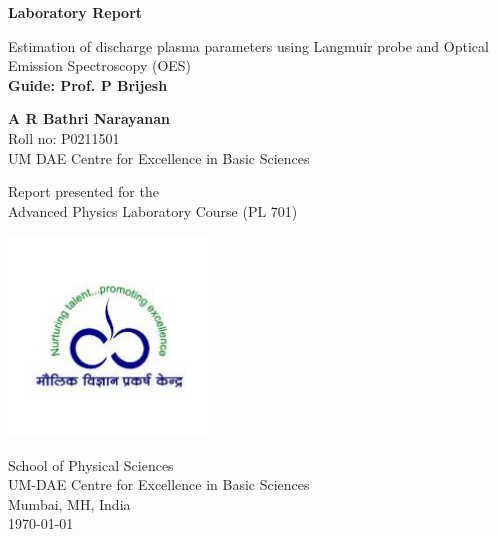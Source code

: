 \begin{titlepage}
	\begin{center}
		\vspace*{0.8cm}
		
		\Huge
		\textbf{Laboratory Report}
		
		\vspace{0.5cm}
		\LARGE
		Estimation of discharge plasma parameters using Langmuir probe and Optical Emission Spectroscopy (OES)\\
		\vspace{0.5cm}
		\textbf{Guide: Prof. P Brijesh}
		
		\vspace{1.5cm}
		
		\textbf{A R Bathri Narayanan}\\
		Roll no: P0211501\\
		UM DAE Centre for Excellence in Basic Sciences
		
		\vspace{3 cm}
		
		Report presented for the\\
		Advanced Physics Laboratory Course (PL 701)
		
		\vspace{0.8cm}
		
		\includegraphics[width=0.4\textwidth]{cebs.jpg}
		
		\Large
		School of Physical Sciences\\
		UM-DAE Centre for Excellence in Basic Sciences\\
		Mumbai, MH, India\\
		\today
		
	\end{center}
\end{titlepage}
